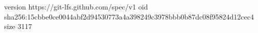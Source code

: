 version https://git-lfs.github.com/spec/v1
oid sha256:15cbbe0ce0044abf2d94530773a4a398249c3978bbb0b87dc08f95824d12cec4
size 3117

